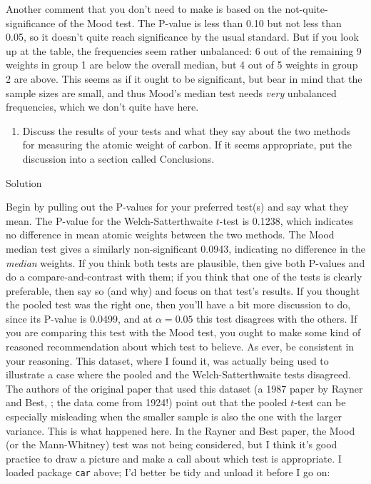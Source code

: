 \documentclass[]{tufte-book}
\providecommand{\tightlist}{%
  \setlength{\itemsep}{0pt}\setlength{\parskip}{0pt}}
\theoremstyle{definition}
\theoremstyle{definition}
\theoremstyle{definition}
\theoremstyle{remark}
\begin{document}
Another comment that you don't need to make is based on the
not-quite-significance of the Mood test. The P-value is less than 0.10
but not less than 0.05, so it doesn't quite reach significance by the
usual standard. But if you look up at the table, the frequencies seem
rather unbalanced: 6 out of the remaining 9 weights in group 1 are below
the overall median, but 4 out of 5 weights in group 2 are above. This
seems as if it ought to be significant, but bear in mind that the sample
sizes are small, and thus Mood's median test needs \emph{very}
unbalanced frequencies, which we don't quite have here.

\begin{enumerate}
\def\labelenumi{(\alph{enumi})}
\setcounter{enumi}{7}
\tightlist
\item
  Discuss the results of your tests and what they say about the two
  methods for measuring the atomic weight of carbon. If it seems
  appropriate, put the discussion into a section called Conclusions.
\end{enumerate}

Solution

Begin by pulling out the P-values for your preferred test(s) and say
what they mean. The P-value for the Welch-Satterthwaite \(t\)-test is
0.1238, which indicates no difference in mean atomic weights between the
two methods. The Mood median test gives a similarly non-significant
0.0943, indicating no difference in the \emph{median} weights. If you
think both tests are plausible, then give both P-values and do a
compare-and-contrast with them; if you think that one of the tests is
clearly preferable, then say so (and why) and focus on that test's
results. If you thought the pooled test was the right one, then you'll
have a bit more discussion to do, since its P-value is 0.0499, and at
\(\alpha=0.05\) this test disagrees with the others. If you are
comparing this test with the Mood test, you ought to make some kind of
reasoned recommendation about which test to believe. As ever, be
consistent in your reasoning. This dataset, where I found it, was
actually being used to illustrate a case where the pooled and the
Welch-Satterthwaite tests disagreed. The authors of the original paper
that used this dataset (a 1987 paper by Rayner and Best,
\cite{rayner-best}; the data come from 1924!) point out that the pooled
\(t\)-test can be especially misleading when the smaller sample is also
the one with the larger variance. This is what happened here. In the
Rayner and Best paper, the Mood (or the Mann-Whitney) test was not being
considered, but I think it's good practice to draw a picture and make a
call about which test is appropriate. I loaded package \texttt{car}
above; I'd better be tidy and unload it before I go on:
\end{document}
